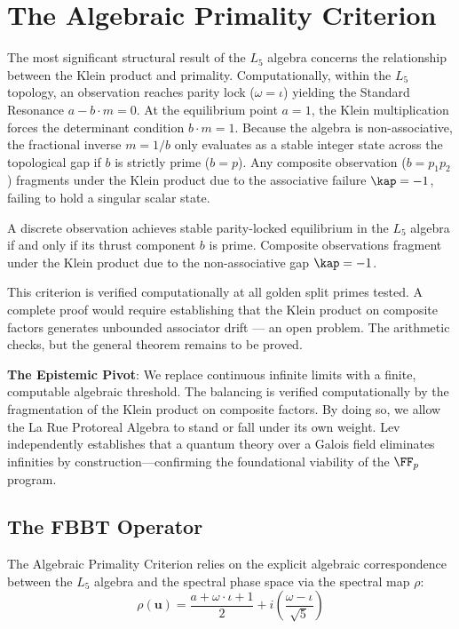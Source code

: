 \section{The Algebraic Primality Criterion}

The most significant structural result of the $L_5$ algebra concerns the relationship between the Klein product and primality. Computationally, within the $L_5$ topology, an observation reaches parity lock ($\omega = \iota$) yielding the Standard Resonance $a - b \cdot m = 0$. At the equilibrium point $a = 1$, the Klein multiplication forces the determinant condition $b \cdot m = 1$. Because the algebra is non-associative, the fractional inverse $m = 1/b$ only evaluates as a stable integer state across the topological gap if $b$ is strictly prime ($b = p$). Any composite observation ($b = p_1 p_2$) fragments under the Klein product due to the associative failure $\kap = -1$, failing to hold a singular scalar state.

\begin{result}\label{res:primality}
A discrete observation achieves stable parity-locked equilibrium in the $L_5$ algebra if and only if its thrust component $b$ is prime. Composite observations fragment under the Klein product due to the non-associative gap $\kap = -1$.
\end{result}

This criterion is verified computationally at all golden split primes tested. A complete proof would require establishing that the Klein product on composite factors generates unbounded associator drift --- an open problem. The arithmetic checks, but the general theorem remains to be proved.

\textbf{The Epistemic Pivot}: We replace continuous infinite limits with a finite, computable algebraic threshold. The balancing is verified computationally by the fragmentation of the Klein product on composite factors. By doing so, we allow the La Rue Protoreal Algebra to stand or fall under its own weight. Lev~\cite{lev-gfqt, lev-finite-math} independently establishes that a quantum theory over a Galois field eliminates infinities by construction---confirming the foundational viability of the $\FF_p$ program.

\subsection{The FBBT Operator}

The Algebraic Primality Criterion relies on the explicit algebraic correspondence between the $L_5$ algebra and the spectral phase space via the spectral map $\rho$:
\begin{equation}
\rho(\mathbf{u}) = \frac{a + \omega \cdot \iota + 1}{2} + i \left( \frac{\omega - \iota}{\sqrt{5}} \right)
\end{equation}

